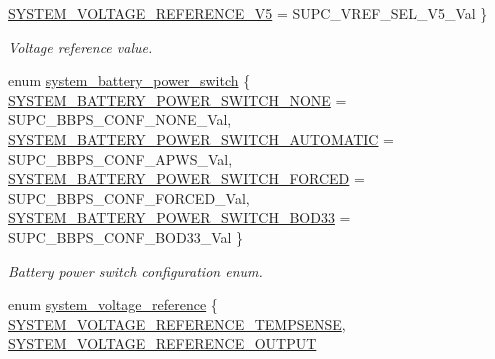 \begin{DoxyCompactItemize}
\hyperlink{group__asfdoc__sam0__system__group_gga05cd664c0c675f440e25980147d01f15a92eed9eb4ca1bb22b2ed51e5fa04429d}{S\+Y\+S\+T\+E\+M\+\_\+\+V\+O\+L\+T\+A\+G\+E\+\_\+\+R\+E\+F\+E\+R\+E\+N\+C\+E\+\_\+V5} = S\+U\+P\+C\+\_\+\+V\+R\+E\+F\+\_\+\+S\+E\+L\+\_\+V5\+\_\+\+Val
 \}
\begin{DoxyCompactList}\small\item\em Voltage reference value. \end{DoxyCompactList}\item 
enum \hyperlink{group__asfdoc__sam0__system__group_gab2f5386110553d7c7501d7329a165b91}{system\+\_\+battery\+\_\+power\+\_\+switch} \{ \hyperlink{group__asfdoc__sam0__system__group_ggab2f5386110553d7c7501d7329a165b91a19d960eac39561f4bf510144b30c17d0}{S\+Y\+S\+T\+E\+M\+\_\+\+B\+A\+T\+T\+E\+R\+Y\+\_\+\+P\+O\+W\+E\+R\+\_\+\+S\+W\+I\+T\+C\+H\+\_\+\+N\+O\+N\+E} = S\+U\+P\+C\+\_\+\+B\+B\+P\+S\+\_\+\+C\+O\+N\+F\+\_\+\+N\+O\+N\+E\+\_\+\+Val, 
\hyperlink{group__asfdoc__sam0__system__group_ggab2f5386110553d7c7501d7329a165b91aaa701e5d2c66243ef689e14ef3cf7c7d}{S\+Y\+S\+T\+E\+M\+\_\+\+B\+A\+T\+T\+E\+R\+Y\+\_\+\+P\+O\+W\+E\+R\+\_\+\+S\+W\+I\+T\+C\+H\+\_\+\+A\+U\+T\+O\+M\+A\+T\+I\+C} = S\+U\+P\+C\+\_\+\+B\+B\+P\+S\+\_\+\+C\+O\+N\+F\+\_\+\+A\+P\+W\+S\+\_\+\+Val, 
\hyperlink{group__asfdoc__sam0__system__group_ggab2f5386110553d7c7501d7329a165b91afff2e8d4e8bb2ca190e43a540bdc7c35}{S\+Y\+S\+T\+E\+M\+\_\+\+B\+A\+T\+T\+E\+R\+Y\+\_\+\+P\+O\+W\+E\+R\+\_\+\+S\+W\+I\+T\+C\+H\+\_\+\+F\+O\+R\+C\+E\+D} = S\+U\+P\+C\+\_\+\+B\+B\+P\+S\+\_\+\+C\+O\+N\+F\+\_\+\+F\+O\+R\+C\+E\+D\+\_\+\+Val, 
\hyperlink{group__asfdoc__sam0__system__group_ggab2f5386110553d7c7501d7329a165b91a0f3607410bf048dbe96724a265b93846}{S\+Y\+S\+T\+E\+M\+\_\+\+B\+A\+T\+T\+E\+R\+Y\+\_\+\+P\+O\+W\+E\+R\+\_\+\+S\+W\+I\+T\+C\+H\+\_\+\+B\+O\+D33} = S\+U\+P\+C\+\_\+\+B\+B\+P\+S\+\_\+\+C\+O\+N\+F\+\_\+\+B\+O\+D33\+\_\+\+Val
 \}
\begin{DoxyCompactList}\small\item\em Battery power switch configuration enum. \end{DoxyCompactList}\item 
enum \hyperlink{group__asfdoc__sam0__system__group_gae3ed274224184cfb1d173b146bd72170}{system\+\_\+voltage\+\_\+reference} \{ \hyperlink{group__asfdoc__sam0__system__group_ggae3ed274224184cfb1d173b146bd72170aec400f1f06b7017c7fdca8e2c8205e36}{S\+Y\+S\+T\+E\+M\+\_\+\+V\+O\+L\+T\+A\+G\+E\+\_\+\+R\+E\+F\+E\+R\+E\+N\+C\+E\+\_\+\+T\+E\+M\+P\+S\+E\+N\+S\+E}, 
\hyperlink{group__asfdoc__sam0__system__group_ggae3ed274224184cfb1d173b146bd72170ad43a090b917baa0bc23ac3f64d6a4958}{S\+Y\+S\+T\+E\+M\+\_\+\+V\+O\+L\+T\+A\+G\+E\+\_\+\+R\+E\+F\+E\+R\+E\+N\+C\+E\+\_\+\+O\+U\+T\+P\+U\+T}

\end{DoxyCompactItemize}
